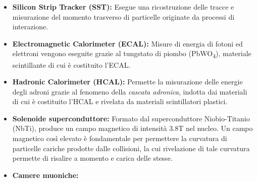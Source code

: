\begin{itemize}
  \item \textbf{Silicon Strip Tracker (SST):} Esegue una ricostruzione delle tracce e misurazione del momento trasverso di particelle originate da processi di interazione. 
  \item \textbf{Electromagnetic Calorimeter (ECAL):} Misure di energia di fotoni ed elettroni vengono eseguite grazie al tungstato di piombo (\si{PbWO_4}), materiale scintillante di cui è costituito l'ECAL.
  \item \textbf{Hadronic Calorimeter (HCAL):} Permette la misurazione delle energie degli adroni grazie al fenomeno della \textit{cascata adronica}, indotta dai materiali di cui è costituito l'HCAL e rivelata da materiali scintillatori plastici.
  \item \textbf{Solenoide superconduttore:} Formato dal superconduttore Niobio-Titanio (NbTi), produce un campo magnetico di intensità 3.8T nel nucleo. Un campo magnetico così elevato è fondamentale per permettere la curvatura di particelle cariche prodotte dalle collisioni, la cui rivelazione di tale curvatura permette di risalire a momento e carica delle stesse.
  \item \textbf{Camere muoniche:} 
\end{itemize}










